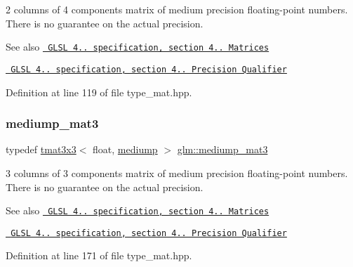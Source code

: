2 columns of 4 components matrix of medium precision floating-\/point numbers. There is no guarantee on the actual precision.

\begin{DoxySeeAlso}{See also}
\href{http://www.opengl.org/registry/doc/GLSLangSpec.4.20.8.pdf}{\texttt{ G\+L\+SL 4.. specification, section 4.. Matrices}} 

\href{http://www.opengl.org/registry/doc/GLSLangSpec.4.20.8.pdf}{\texttt{ G\+L\+SL 4.. specification, section 4.. Precision Qualifier}} 
\end{DoxySeeAlso}


Definition at line 119 of file type\+\_\+mat.\+hpp.

\mbox{\label{group__core__precision_ga59f8b29bbf809530ab4c0ee97d03a4f9}} 
\subsubsection{\texorpdfstring{mediump\_mat3}{mediump\_mat3}}
{\footnotesize\ttfamily typedef \mbox{\hyperlink{structglm_1_1tmat3x3}{tmat3x3}}$<$ float, \mbox{\hyperlink{namespaceglm_a0f04f086094c747d227af4425893f545a6416f3ea0c9025fb21ed50c4d6620482}{mediump}} $>$ \mbox{\hyperlink{group__core__precision_ga59f8b29bbf809530ab4c0ee97d03a4f9}{glm\+::mediump\+\_\+mat3}}}

3 columns of 3 components matrix of medium precision floating-\/point numbers. There is no guarantee on the actual precision.

\begin{DoxySeeAlso}{See also}
\href{http://www.opengl.org/registry/doc/GLSLangSpec.4.20.8.pdf}{\texttt{ G\+L\+SL 4.. specification, section 4.. Matrices}} 

\href{http://www.opengl.org/registry/doc/GLSLangSpec.4.20.8.pdf}{\texttt{ G\+L\+SL 4.. specification, section 4.. Precision Qualifier}} 
\end{DoxySeeAlso}


Definition at line 171 of file type\+\_\+mat.\+hpp.

\mbox{\label{group__core__precision_ga2237b9bb71ea5b0d2ae07f9315ccdc28}} 
